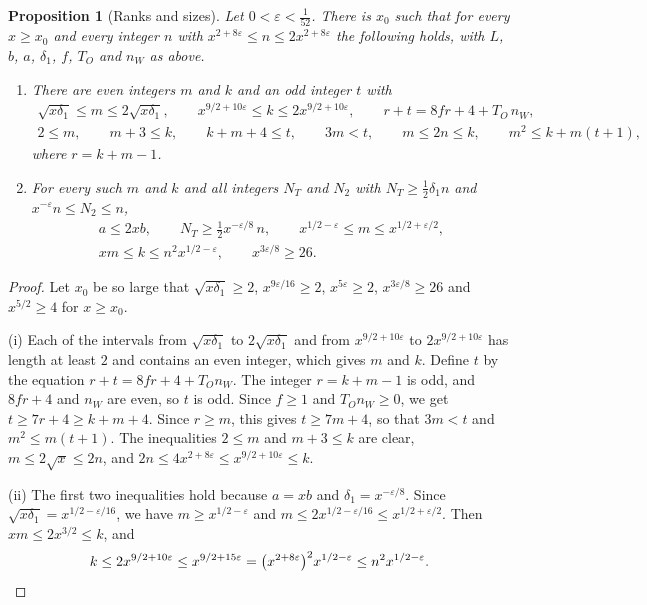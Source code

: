\documentclass[11pt,letterpaper]{article}
\newtheorem{proposition}[theorem]{Proposition}
\numberwithin{equation}{section}
\begin{document}
\begin{proposition}[Ranks and sizes]\label{ranks}
Let $0<\varepsilon<\tfrac1{52}$. There is $x_0$ such that for every $x\ge x_0$ and every integer $n$ with $x^{2+8\varepsilon}\le n\le2x^{2+8\varepsilon}$ the following holds, with $L$, $b$, $a$, $\delta_1$, $f$, $T_O$ and $n_W$ as above.
\begin{enumerate}
\item[(i)] There are even integers $m$ and $k$ and an odd integer $t$ with
\begin{gather*}
\sqrt{x\delta_1}\le m\le2\sqrt{x\delta_1},\qquad x^{9/2+10\varepsilon}\le k\le2x^{9/2+10\varepsilon},\qquad r+t=8fr+4+T_O\,n_W,\\
2\le m,\qquad m+3\le k,\qquad k+m+4\le t,\qquad3m<t,\qquad m\le2n\le k,\qquad m^2\le k+m(t+1),
\end{gather*}
where $r=k+m-1$.
\item[(ii)] For every such $m$ and $k$ and all integers $N_T$ and $N_2$ with $N_T\ge\tfrac12\delta_1n$ and $x^{-\varepsilon}n\le N_2\le n$,
\begin{gather*}
a\le2xb,\qquad N_T\ge\tfrac12x^{-\varepsilon/8}\,n,\qquad x^{1/2-\varepsilon}\le m\le x^{1/2+\varepsilon/2},\\
xm\le k\le n^2x^{1/2-\varepsilon},\qquad x^{3\varepsilon/8}\ge26.
\end{gather*}
\end{enumerate}
\end{proposition}
\begin{proof}
Let $x_0$ be so large that $\sqrt{x\delta_1}\ge2$, $x^{9\varepsilon/16}\ge2$, $x^{5\varepsilon}\ge2$, $x^{3\varepsilon/8}\ge26$ and $x^{5/2}\ge4$ for $x\ge x_0$.

(i) Each of the intervals from $\sqrt{x\delta_1}$ to $2\sqrt{x\delta_1}$ and from $x^{9/2+10\varepsilon}$ to $2x^{9/2+10\varepsilon}$ has length at least $2$ and contains an even integer, which gives $m$ and $k$. Define $t$ by the equation $r+t=8fr+4+T_On_W$. The integer $r=k+m-1$ is odd, and $8fr+4$ and $n_W$ are even, so $t$ is odd. Since $f\ge1$ and $T_On_W\ge0$, we get $t\ge7r+4\ge k+m+4$. Since $r\ge m$, this gives $t\ge7m+4$, so that $3m<t$ and $m^2\le m(t+1)$. The inequalities $2\le m$ and $m+3\le k$ are clear, $m\le2\sqrt x\le2n$, and $2n\le4x^{2+8\varepsilon}\le x^{9/2+10\varepsilon}\le k$.

(ii) The first two inequalities hold because $a=xb$ and $\delta_1=x^{-\varepsilon/8}$. Since $\sqrt{x\delta_1}=x^{1/2-\varepsilon/16}$, we have $m\ge x^{1/2-\varepsilon}$ and $m\le2x^{1/2-\varepsilon/16}\le x^{1/2+\varepsilon/2}$. Then $xm\le2x^{3/2}\le k$, and
\[
k\le2x^{9/2+10\varepsilon}\le x^{9/2+15\varepsilon}=\big(x^{2+8\varepsilon}\big)^2x^{1/2-\varepsilon}\le n^2x^{1/2-\varepsilon}.\qedhere
\]
\end{proof}
\end{document}
